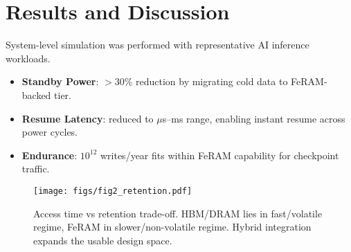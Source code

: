 \section{Results and Discussion}
System-level simulation was performed with representative AI inference workloads.

\begin{itemize}
  \item \textbf{Standby Power}: $>$30\% reduction by migrating cold data to FeRAM-backed tier.
  \item \textbf{Resume Latency}: reduced to $\mu$s–ms range, enabling instant resume across power cycles.
  \item \textbf{Endurance}: $10^{12}$ writes/year fits within FeRAM capability for checkpoint traffic.
\end{itemize}

\begin{figure}[!t]
\centering
\texttt{[image: figs/fig2\_retention.pdf]}
\caption{Access time vs retention trade-off. HBM/DRAM lies in fast/volatile regime, FeRAM in slower/non-volatile regime. Hybrid integration expands the usable design space.}
\label{fig:retention_map}
\end{figure}
